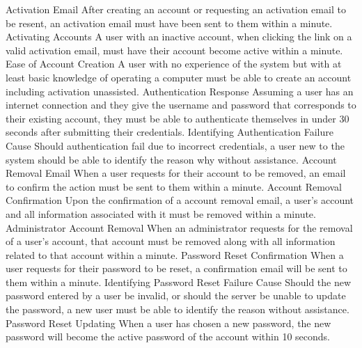 		\nonfuncreq
			{Activation Email}
			{After creating an account or requesting an activation email to be
			resent, an activation email must have been sent to them within a
			minute.}
		\nonfuncreq
			{Activating Accounts}
			{A user with an inactive account, when clicking the link on a valid
			activation email, must have their account become active within a
			minute.}
		\nonfuncreq
			{Ease of Account Creation}
			{A user with no experience of the system but with at least basic
			knowledge of operating a computer must be able to create an account
			including activation unassisted.}
		\nonfuncreq
			{Authentication Response}
			{Assuming a user has an internet connection and they give the
			username and password that corresponds to their existing account,
			they must be able to authenticate themselves in under 30 seconds
			after submitting their credentials.}
		\nonfuncreq
			{Identifying Authentication Failure Cause}
			{Should authentication fail due to incorrect credentials, a user
			new to the system should be able to identify the reason why without
			assistance.}
		\nonfuncreq
			{Account Removal Email}
			{When a user requests for their account to be removed, an email to
			confirm the action must be sent to them within a minute.}
		\nonfuncreq
			{Account Removal Confirmation}
			{Upon the confirmation of a account removal email, a user's account
			and all information associated with it must be removed within a
			minute.}
		\nonfuncreq
			{Administrator Account Removal}
			{When an administrator requests for the removal of a user's
			account, that account must be removed along with all information
			related to that account within a minute.}
		\nonfuncreq
			{Password Reset Confirmation}
			{When a user requests for their password to be reset, a
			confirmation email will be sent to them within a minute.}
		\nonfuncreq
			{Identifying Password Reset Failure Cause}
			{Should the new password entered by a user be invalid, or should
			the server be unable to update the password, a new user must be
			able to identify the reason without assistance.}
		\nonfuncreq
			{Password Reset Updating}
			{When a user has chosen a new password, the new password will
			become the active password of the account within 10 seconds.}
